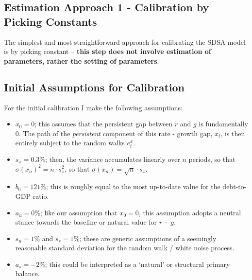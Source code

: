 \documentclass{article}
\begin{document}
\subsection{Estimation Approach 1 - Calibration by Picking Constants}
\label{sec:sdsa_starter_random_walk}

The simplest and most straightforward approach for calibrating the SDSA model is by picking constant -- \textbf{this step does not involve estimation of parameters, rather the setting of parameters}. 

\subsection{Initial Assumptions for Calibration}

For the initial calibration I make the following assumptions:
\begin{itemize}
	\item $x_0 = 0$; this assumes that the persistent gap between $r$ and $g$ is fundamentally 0. The path of the \textit{persistent} component of this rate - growth gap, $x_t$, is then entirely subject to the random walks $e_t^x$. 
	\item $s_x = 0.3\%$; then, the variance accumulates linearly over $n$ periods, so that $\sigma(x_n)^2 = n \cdot s_x^2$, so that $\sigma(x_n) = \sqrt{n} \cdot s_x$. 
	\item $b_0 = 121\%$; this is roughly equal to the most up-to-date value for the debt-to-GDP ratio.
	\item $a_u = 0\%$; like our assumption that $x_0 = 0$, this assumption adopts a neutral stance towards the baseline or natural value for $r-g$.
	\item $s_u = 1\%$ and $s_s = 1\%$; these are generic assumptions of a seemingly reasonable standard deviation for the random walk / white noise process.
	\item $a_s = -2\%$; this could be interpreted as a `natural' or structural primary balance.
\end{itemize}
\end{document}
